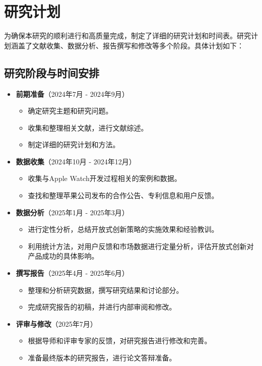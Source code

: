 
\chapter{研究计划}

为确保本研究的顺利进行和高质量完成，制定了详细的研究计划和时间表。研究计划涵盖了文献收集、数据分析、报告撰写和修改等多个阶段。具体计划如下：

\section{研究阶段与时间安排}

\begin{itemize}
    \item \textbf{前期准备}（2024年7月 - 2024年9月）
    \begin{itemize}
        \item 确定研究主题和研究问题。
        \item 收集和整理相关文献，进行文献综述。
        \item 制定详细的研究计划和方法。
    \end{itemize}

    \item \textbf{数据收集}（2024年10月 - 2024年12月）
    \begin{itemize}
        \item 收集与Apple Watch开发过程相关的案例和数据。
        \item 查找和整理苹果公司发布的合作公告、专利信息和用户反馈。
    \end{itemize}

    \item \textbf{数据分析}（2025年1月 - 2025年3月）
    \begin{itemize}
        \item 进行定性分析，总结开放式创新策略的实施效果和经验教训。
        \item 利用统计方法，对用户反馈和市场数据进行定量分析，评估开放式创新对产品成功的具体影响。
    \end{itemize}

    \item \textbf{撰写报告}（2025年4月 - 2025年6月）
    \begin{itemize}
        \item 整理和分析研究数据，撰写研究结果和讨论部分。
        \item 完成研究报告的初稿，并进行内部审阅和修改。
    \end{itemize}

    \item \textbf{评审与修改}（2025年7月）
    \begin{itemize}
        \item 根据导师和评审专家的反馈，对研究报告进行修改和完善。
        \item 准备最终版本的研究报告，进行论文答辩准备。
    \end{itemize}
\end{itemize}

